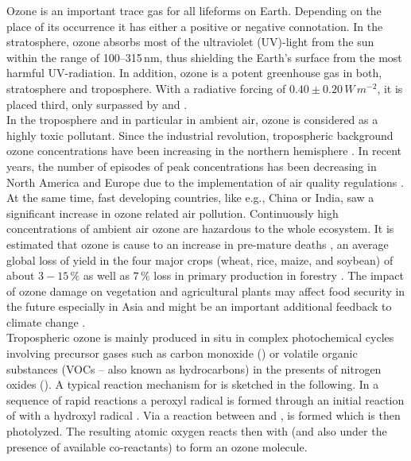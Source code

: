 \documentclass[gmd, manuscript]{copernicus}
\begin{document}
\introduction  %
\label{sec:intro}
Ozone is an important trace gas for all lifeforms on Earth. Depending on the place of its occurrence it has either a positive or negative connotation. In the stratosphere, ozone absorbs most of the ultraviolet (UV)-light from the sun within the range of 100--315\,\unit{nm}, thus shielding the Earth's surface from the most harmful UV-radiation. In addition, ozone is a potent greenhouse gas in both, stratosphere and troposphere. With a radiative forcing of $0.40 \pm 0.20\,\unit{W\,m^{-2}}$, it is placed third, only surpassed by  and  \citep[Chapter 8]{IPCC2013}.\\
In the troposphere and in particular in ambient air, ozone is considered as a highly toxic pollutant. Since the industrial revolution, tropospheric background ozone concentrations have been increasing in the northern hemisphere \citep[Chapter 2]{IPCC2013}. In recent years, the number of episodes of peak concentrations has been decreasing in North America and Europe due to the implementation of air quality regulations \citep[e.g.,][]{ACP:Wilson2012}. At the same time, fast developing countries, like e.g., China or India, saw a significant increase in ozone related air pollution. Continuously high concentrations of ambient air ozone are hazardous to the whole ecosystem. It is estimated that ozone is cause to an increase in pre-mature deaths \citep{WHO2008}, an average global loss of yield in the four major crops (wheat, rice, maize, and soybean) of about $3-15\,\unit{\%}$ \citep{PJ:Ainsworth2017} as well as $7\,\unit{\%}$ loss in primary production in forestry \citep{GCB:Wittig2009,EP:Matyssek2012}. The impact of ozone damage on vegetation and agricultural plants may affect food security in the future especially in Asia \citep{GCB:Tang2013,NCC:Tai2014,AE:Chuwah2015} and might be an important additional feedback to climate change \citep{Nat:Sitch2007}.\\
Tropospheric ozone is mainly produced in situ in complex photochemical cycles involving precursor gases such as carbon monoxide () or volatile organic substances (VOCs -- also known as hydrocarbons) in the presents of nitrogen oxides (). A typical reaction mechanism for  is sketched in the following. In a sequence of rapid reactions a peroxyl radical  is formed through an initial reaction of  with a hydroxyl radical .
Via a reaction between  and ,  is formed which is then photolyzed. The resulting atomic oxygen reacts then with  (and also under the presence of available co-reactants) to form an ozone molecule.
\end{document}
